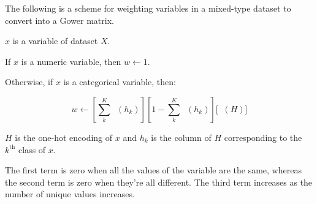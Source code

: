 \documentclass[11pt]{article}
\DeclareMathOperator{\Var}{\widehat{Var}}
\DeclareMathOperator{\Kurt}{\widehat{Kurtosis}}
\begin{document}
    The following is a scheme for weighting variables in a mixed-type dataset to convert into a Gower
    matrix.

    $x$ is a variable of dataset $X$.

    If $x$ is a numeric variable, then $w\leftarrow1$.

    Otherwise, if $x$ is a categorical variable, then:

    \begin{equation}
        w\leftarrow
        \left[\sum_k^K{\Var(h_k)}\right]
        \left[1-\sum_k^K{\Var(h_k)}\right]
        \Biggl[\Kurt(H)\Biggr]\label{eq:equation}
    \end{equation}

    $H$ is the one-hot encoding of $x$ and $h_k$ is the column of $H$ corresponding to the $k^{\text{th}}$ class of $x$.

    The first term is zero when all the values of the variable are the same, whereas the second term is zero when
    they're all different.
    The third term increases as the number of unique values increases.
\end{document}
